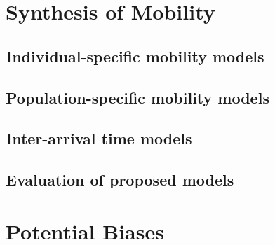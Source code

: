 \documentclass[journal]{IEEEtran}
\begin{document}
\section{Synthesis of Mobility} \label{sec:synthesis}

\subsection{Individual-specific mobility models}

\subsection{Population-specific mobility models}

\subsection{Inter-arrival time models}

\subsection{Evaluation of proposed models}


\section{Potential Biases} \label{sec:bias}


%
%

\end{document}
